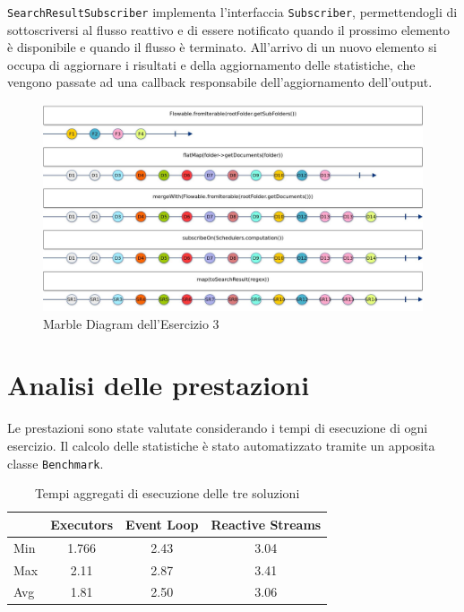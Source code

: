 ﻿\documentclass[a4paper]{article}
\begin{document}
\texttt{SearchResultSubscriber} implementa l'interfaccia \texttt{Subscriber}, permettendogli di sottoscriversi al flusso reattivo e di essere notificato quando il prossimo elemento \`e disponibile e quando il flusso \`e terminato.
%
All'arrivo di un nuovo elemento si occupa di aggiornare i risultati e della aggiornamento delle statistiche, che vengono passate ad una callback responsabile dell'aggiornamento dell'output.

\begin{figure}[H]

    \centering

    \includegraphics[width=\linewidth, height=\textheight,keepaspectratio]{ReactiveStreams}

    \caption{Marble Diagram dell'Esercizio 3}

    \label{fig:event-loop}

\end{figure}

\section{Analisi delle prestazioni}\label{analisi-delle-prestazioni}

Le prestazioni sono state valutate considerando i tempi di esecuzione di ogni esercizio.
%
Il calcolo delle statistiche \`e stato automatizzato tramite un apposita classe \texttt{Benchmark}.

\begin{table}[H]

\centering

\label{my-label}

\begin{tabular}{l|ccc}
\hline
    & Executors & Event Loop & Reactive Streams \\ \hline
Min & 1.766     & 2.43       & 3.04             \\
Max & 2.11      & 2.87       & 3.41             \\
Avg & 1.81      & 2.50       & 3.06             \\ \hline
\end{tabular}

\caption{Tempi aggregati di esecuzione delle tre soluzioni}

\label{Tabella speedup del sistema}

\end{table}

\end{document}
